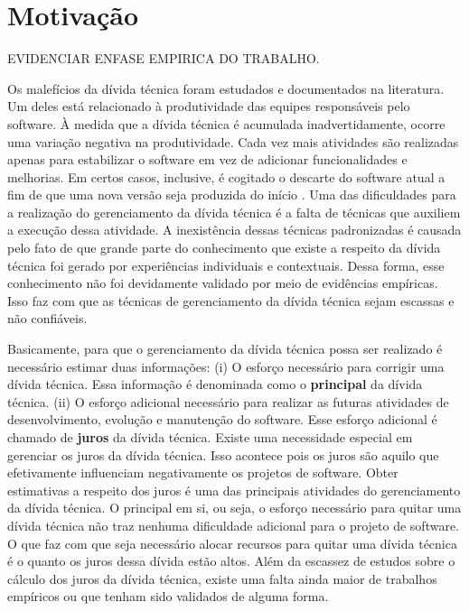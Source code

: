 \section{Motivação}
EVIDENCIAR ENFASE EMPIRICA DO TRABALHO.

Os malefícios da dívida técnica foram estudados e documentados na literatura\cite{zazworka2011investigating,power2013understanding}. Um deles está relacionado à produtividade das equipes responsáveis pelo software. À medida que a dívida técnica é acumulada inadvertidamente, ocorre uma variação negativa na produtividade.  Cada vez mais atividades são realizadas apenas para estabilizar o software em vez de adicionar funcionalidades e melhorias. Em certos casos, inclusive, é cogitado o descarte do software atual a fim de que uma nova versão seja produzida do início \cite{sterling2010managing}. Uma das dificuldades para a realização do gerenciamento da dívida técnica é a falta de técnicas que auxiliem a execução dessa atividade. A inexistência dessas técnicas padronizadas é causada pelo fato de que grande parte do conhecimento que existe a respeito da dívida técnica foi gerado por experiências individuais e contextuais. Dessa forma, esse conhecimento não foi devidamente validado por meio de evidências empíricas. Isso faz com que as técnicas de gerenciamento  da dívida técnica sejam escassas e não confiáveis\cite{brown2010managing}. 

Basicamente, para que o gerenciamento da dívida técnica possa ser realizado é necessário estimar duas informações:
(i)	O esforço necessário para corrigir uma dívida técnica. Essa informação é denominada como o \textbf{principal} da dívida técnica.
(ii)	O esforço adicional necessário para realizar as futuras atividades de desenvolvimento, evolução e manutenção do software.  Esse esforço adicional é chamado de \textbf{juros} da dívida técnica. Existe uma necessidade especial em gerenciar os juros da dívida técnica. Isso acontece pois os juros são aquilo que efetivamente influenciam negativamente os projetos de software.  Obter estimativas a respeito dos juros é uma das principais atividades do gerenciamento da dívida técnica. O principal em si, ou seja, o esforço necessário para quitar uma dívida técnica não traz nenhuma dificuldade adicional para o projeto de software. O que faz com que seja necessário alocar recursos para quitar uma dívida técnica é o quanto os juros dessa dívida estão altos. Além da escassez de estudos sobre o cálculo dos juros da dívida técnica, existe uma falta ainda maior de trabalhos empíricos ou que tenham sido validados de alguma forma. 

